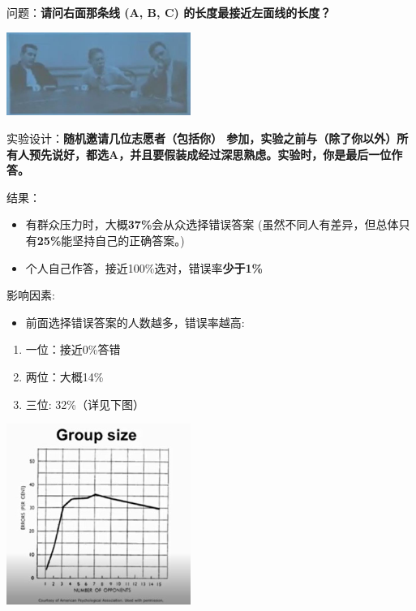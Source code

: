 问题：\textbf{请问右面那条线 (A, B, C) 的长度最接近左面线的长度？}


\includegraphics[width=6cm]{Asch2Screenshot.jpg}

实验设计：\textbf{随机邀请几位志愿者（包括你）
参加，实验之前与（除了你以外）所有人预先说好，都选A，并且要假装成经过深思熟虑。实验时，你是最后一位作答。}

结果：

\begin{itemize}
\tightlist
\item
  有群众压力时，大概\textbf{37\%}会从众选择错误答案
  (虽然不同人有差异，但总体只有\textbf{25\%}能坚持自己的正确答案。)
\item
  个人自己作答，接近100\%选对，错误率\textbf{少于1\%}
\end{itemize}

影响因素:

\begin{itemize}
\tightlist
\item
  前面选择错误答案的人数越多，错误率越高:
\end{itemize}

\begin{enumerate}
\tightlist
\item
  一位：接近0\%答错
\item
  两位：大概14\%
\item
  三位: 32\%（详见下图）
\end{enumerate}


\includegraphics[width=6cm]{Asch3Screenshot_2022-07-08_201341.jpg}

